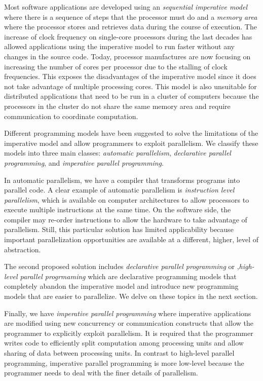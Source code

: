 Most software applications are developed using an \emph{sequential imperative
model} where there is a sequence of steps that the processor must do and a
\emph{memory area} where the processor stores and retrieves data during the
course of execution.  The increase of clock frequency on single-core processors
during the last decades has allowed applications using the imperative model to
run faster without any changes in the source code. Today, processor manufactures
are now focusing on increasing the number of cores per processor due to the
stalling of clock frequencies. This exposes the disadvantages of the imperative
model since it does not take advantage of multiple processing cores. This model
is also unsuitable for distributed applications that need to be run in a cluster
of computers because the processors in the cluster do not share the same memory
area and require communication to coordinate computation.

Different programming models have been suggested to solve the limitations of the
imperative model and allow programmers to exploit parallelism. We classify these
models into three main classes: \emph{automatic parallelism}, \emph{declarative
parallel programming}, and \emph{imperative parallel programming}.

In automatic parallelism, we have a compiler that transforms programs into
parallel code. A clear example of automatic parallelism is \emph{instruction
level parallelism}, which is available on computer architectures to allow
processors to execute multiple instructions at the same time. On the software
side, the compiler may re-order instructions to allow the hardware to take
advantage of parallelism.  Still, this particular solution has limited
applicability because important parallelization opportunities are available at a
different, higher, level of abstraction.

The second proposed solution includes \emph{declarative parallel programming} or
,\emph{high-level parallel progrmaming} which are declarative programming models
that completely abandon the imperative model and introduce new programming
models that are easier to parallelize. We delve on these topics in the next
section.

Finally, we have \emph{imperative parallel programming} where imperative
applications are modified using new concurrency or communication constructs that
allow the programmer to explicitly exploit parallelism. It is required that the
programmer writes code to efficiently split computation among processing units
and allow sharing of data between processing units. In contrast to high-level
parallel programming, imperative parallel programming is more low-level because
the programmer needs to deal with the finer details of parallelism.

